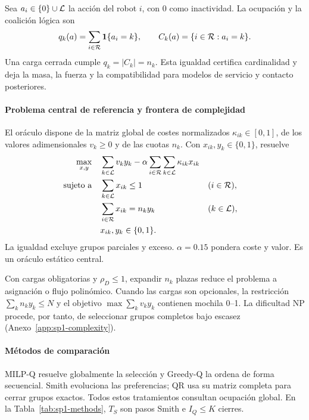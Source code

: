 Sea $a_i\in\{0\}\cup\mathcal{L}$ la acción del robot $i$, con $0$ como inactividad. La ocupación y la coalición lógica son
\begin{equation}
 q_k(a)=\sum_{i\in\mathcal{R}}\mathbf1\{a_i=k\},\qquad
 C_k(a)=\{i\in\mathcal{R}:a_i=k\}.
 \label{eq:sp1-occupancy}
\end{equation}
Una carga cerrada cumple \(q_k=|C_k|=n_k\). Esta igualdad certifica cardinalidad y deja la masa, la fuerza y la compatibilidad para modelos de servicio y contacto posteriores.

\paragraph{Problema central de referencia y frontera de complejidad}

El oráculo dispone de la matriz global de costes normalizados $\kappa_{ik}\in[0, 1]$, de los valores adimensionales $v_k\geq0$ y de las cuotas $n_k$. Con $x_{ik},y_k\in\{0, 1\}$, resuelve
\begin{equation}
\label{eq:sp1-oracle}
\begin{aligned}
 \max_{x,y}\quad &\sum_{k\in\mathcal{L}}v_ky_k
 -\alpha\sum_{i\in\mathcal{R}}\sum_{k\in\mathcal{L}}\kappa_{ik}x_{ik}\\
 \text{sujeto a}\quad
 &\sum_{k\in\mathcal{L}}x_{ik}\leq1 &&(i\in\mathcal{R}),\\
 &\sum_{i\in\mathcal{R}}x_{ik}=n_ky_k &&(k\in\mathcal{L}),\\
 &x_{ik},y_k\in\{0, 1\}.&
\end{aligned}
\end{equation}
La igualdad excluye grupos parciales y exceso. $\alpha=0.15$ pondera coste y valor. Es un oráculo estático central.

Con cargas obligatorias y \(\rho_D\leq1\), expandir \(n_k\) plazas reduce el problema a asignación o flujo polinómico. Cuando las cargas son opcionales, la restricción \(\sum_kn_ky_k\leq N\) y el objetivo \(\max\sum_kv_ky_k\) contienen mochila 0--1. La dificultad NP procede, por tanto, de seleccionar grupos completos bajo escasez (Anexo~\ref{app:sp1-complexity}).

\paragraph{Métodos de comparación}

MILP-Q resuelve globalmente la selección y Greedy-Q la ordena de forma secuencial. Smith evoluciona las preferencias; QR usa su matriz completa para cerrar grupos exactos. Todos estos tratamientos consultan ocupación global. En la Tabla~\ref{tab:sp1-methods}, \(T_S\) son pasos Smith e \(I_Q\leq K\) cierres.

